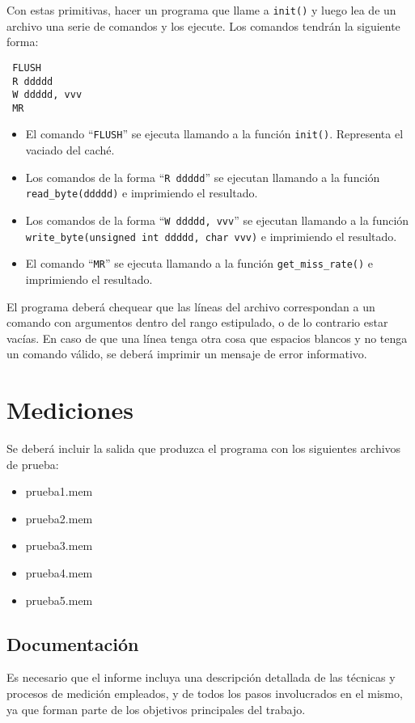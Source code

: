 \documentclass[a4paper,11pt]{article}
\begin{document}
Con estas primitivas, hacer un programa que llame a \texttt{init()} y luego lea de un archivo una serie de comandos y los ejecute. Los comandos tendrán la siguiente forma:

\begin{verbatim}
 FLUSH
 R ddddd
 W ddddd, vvv
 MR
\end{verbatim}
\begin{itemize}
\item El comando ``\texttt{FLUSH}'' se ejecuta llamando a la función \texttt{init()}. Representa el vaciado del caché.
\item Los comandos de la forma ``\texttt{R ddddd}'' se ejecutan llamando a la función \texttt{read\_byte(ddddd)} e imprimiendo el resultado.
\item Los comandos de la forma ``\texttt{W ddddd, vvv}'' se ejecutan llamando a la función \texttt{write\_byte(unsigned int ddddd, char vvv)} e imprimiendo el resultado.
\item El comando ``\texttt{MR}'' se ejecuta llamando a la función \texttt{get\_miss\_rate()} e imprimiendo el resultado.
\end{itemize}
El programa deberá chequear que las líneas del archivo correspondan a un comando con argumentos dentro del rango estipulado, o de lo contrario estar vacías. En caso de que una línea tenga otra cosa que espacios blancos y no tenga un comando válido, se deberá imprimir un mensaje de error informativo.

\section{Mediciones}
Se deberá incluir la salida que produzca el programa con los siguientes archivos de prueba:
\begin{itemize}
\item prueba1.mem
\item prueba2.mem
\item prueba3.mem
\item prueba4.mem
\item prueba5.mem
\end{itemize}

\subsection{Documentación}

Es necesario que el informe incluya una descripción detallada de las técnicas
y procesos de medición empleados, y de todos los pasos involucrados en el
mismo, ya que forman parte de los objetivos principales del trabajo.
\end{document}
